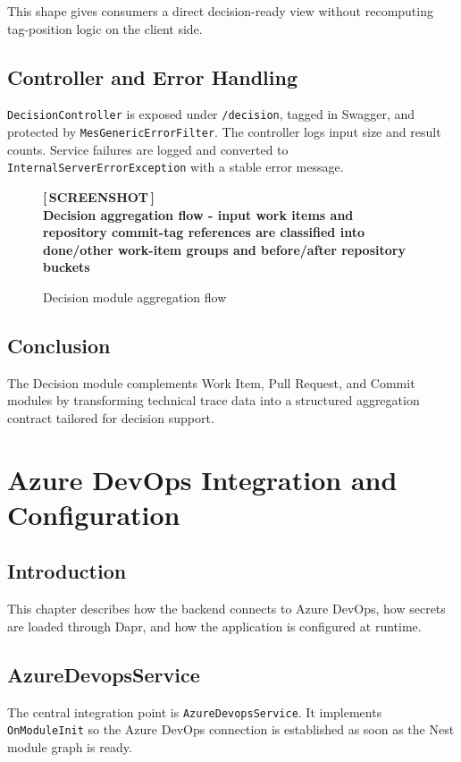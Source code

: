 \documentclass[12pt,a4paper]{report}
\newcommand{\screenshot}[2][Screenshot placeholder]{%
  \begin{figure}[H]
    \centering
    \begin{tcolorbox}[
      enhanced,
      colback=screenshotbg,
      colframe=screenshotborder,
      boxrule=1pt,
      arc=4pt,
      left=4pt, right=4pt, top=4pt, bottom=4pt,
      width=\textwidth,
      height=7cm,
      valign=center,
    ]
      \centering
      \color{primary}
      \large\bfseries [\,SCREENSHOT\,]\\[6pt]
      \normalsize\normalfont\color{darkgray}#1
    \end{tcolorbox}
    \caption{#2}
  \end{figure}%
}
\newcommand{\code}[1]{\texttt{\small\color{codered}#1}}
\begin{document}
\noindent This shape gives consumers a direct decision-ready view without
recomputing tag-position logic on the client side.

\section{Controller and Error Handling}

\code{DecisionController} is exposed under \code{/decision}, tagged in Swagger,
and protected by \code{MesGenericErrorFilter}. The controller logs input size and
result counts. Service failures are logged and converted to
\code{InternalServerErrorException} with a stable error message.

\screenshot[Decision aggregation flow - input work items and repository commit-tag references are classified into done/other work-item groups and before/after repository buckets]{Decision module aggregation flow}

\section{Conclusion}

The Decision module complements Work Item, Pull Request, and Commit modules by
transforming technical trace data into a structured aggregation contract tailored
for decision support.

\chapter{Azure DevOps Integration and Configuration}

\section{Introduction}

This chapter describes how the backend connects to Azure DevOps, how secrets are
loaded through Dapr, and how the application is configured at runtime.

\section{AzureDevopsService}

The central integration point is \code{AzureDevopsService}. It implements
\code{OnModuleInit} so the Azure DevOps connection is established as soon as the
Nest module graph is ready.
\end{document}
